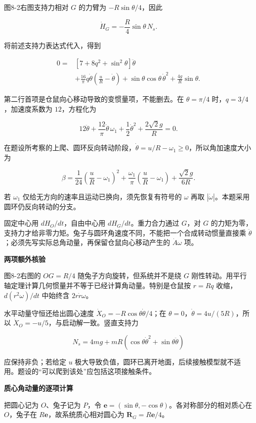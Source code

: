 \documentclass[12pt,a4paper,UTF8]{ctexart}
\begin{document}
图8-2右图支持力相对 \(G\) 的力臂为 \(-R\sin\theta/4\)，因此

\[\dot H_G=-\frac R4\sin\theta\,N_s.\]

将前述支持力表达式代入，得到

\[\begin{aligned}
0={}&\left[7+8q^2+\sin^2\theta\right]\ddot\theta\\
&+\frac{16}\pi q\dot\theta\left(\frac uR-\dot\theta\right)
+\sin\theta\cos\theta\,\dot\theta^2
+\frac{4g}R\sin\theta.
\end{aligned}\]

第二行首项是仓鼠向心移动导致的变惯量项，不能删去。在 \(\theta=\pi/4\)
时，\(q=3/4\)，加速度系数为 \(12\)，方程化为

\[12\ddot\theta+\frac{12}\pi\dot\theta\,\omega_1
+\frac12\dot\theta^2+\frac{2\sqrt2g}R=0.\]

在题设所考察的上爬、圆环反向转动阶段，\(\dot\theta=u/R-\omega_1\ge0\)，所以角加速度大小为

\[\boxed{\beta=
\frac1{24}\left(\frac uR-\omega_1\right)^2
+\frac{\omega_1}\pi\left(\frac uR-\omega_1\right)
+\frac{\sqrt2g}{6R}}.\]

若 \(\omega_1\) 仅给无方向的速率且运动已换向，须先恢复有符号的
\(\omega\) 再取 \(|\dot\omega|\)。本题采用圆环仍反向转动的分支。

固定中心用 \(dH_O/dt\)，自由中心用 \(dH_G/dt\)。重力合力通过 \(G\)，对
\(G\)
的力矩为零，支持力才给非零力矩。兔子与圆环角速度不同，不能把一个合成转动惯量直接乘
\(\ddot\theta\)；必须先写实际总角动量，再保留仓鼠向心移动产生的
\(\dot A\omega\) 项。

\textbf{两项额外核验}

图8-2右图的 \(OG=R/4\) 随兔子方向旋转，但系统并不是绕 \(G\)
刚性转动。用平行轴定理计算几何惯量并不等于已经计算角动量。特别是仓鼠按
\(r=Rq\) 收缩，\(d(r^2\omega)/dt\) 中始终含 \(2r\dot r\omega\)。

水平动量守恒还给出圆心速度 \(\dot X_O=-R\cos\theta\dot\theta/4\)；在
\(\theta=0\)，\(\dot\theta=4u/(5R)\)，所以
\(\dot X_O=-u/5\)，与启动解一致。竖直支持力

\[N_s=4mg+mR(\cos\theta\dot\theta^2+\sin\theta\ddot\theta)\]

应保持非负；若给定 \(u\)
极大导致负值，圆环已离开地面，后续接触模型就不适用。题设的``可以爬到该处''应包括这项接触条件。

\textbf{质心角动量的逐项计算}

把圆心记为 \(O\)、兔子记为 \(P\)，令
\(\bm e=(\sin\theta,-\cos\theta)\)。各对称部分的相对质心在 \(O\)，兔子在
\(R\bm e\)，故系统质心相对圆心为 \(\bm R_G=R\bm e/4\)。
\end{document}

